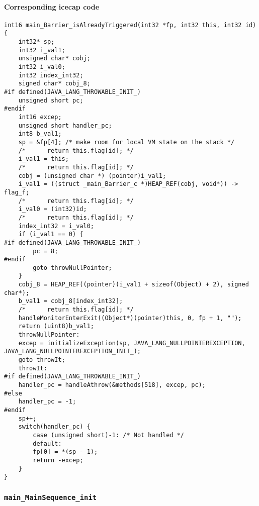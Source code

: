 \paragraph{Corresponding icecap code}\hfill
\begin{lstlisting}[firstnumber=54057]
int16 main_Barrier_isAlreadyTriggered(int32 *fp, int32 this, int32 id)
{
	int32* sp;
	int32 i_val1;
	unsigned char* cobj;
	int32 i_val0;
	int32 index_int32;
	signed char* cobj_8;
#if defined(JAVA_LANG_THROWABLE_INIT_)
	unsigned short pc;
#endif
	int16 excep;
	unsigned short handler_pc;
	int8 b_val1;
	sp = &fp[4]; /* make room for local VM state on the stack */
	/*		return this.flag[id]; */
	i_val1 = this;
	/*		return this.flag[id]; */
	cobj = (unsigned char *) (pointer)i_val1;
	i_val1 = ((struct _main_Barrier_c *)HEAP_REF(cobj, void*)) -> flag_f;
	/*		return this.flag[id]; */
	i_val0 = (int32)id;
	/*		return this.flag[id]; */
	index_int32 = i_val0;
	if (i_val1 == 0) {
#if defined(JAVA_LANG_THROWABLE_INIT_)
		pc = 8;
#endif
		goto throwNullPointer;
	}
	cobj_8 = HEAP_REF((pointer)(i_val1 + sizeof(Object) + 2), signed char*);
	b_val1 = cobj_8[index_int32];
	/*		return this.flag[id]; */
	handleMonitorEnterExit((Object*)(pointer)this, 0, fp + 1, "");
	return (uint8)b_val1;
	throwNullPointer:
	excep = initializeException(sp, JAVA_LANG_NULLPOINTEREXCEPTION, JAVA_LANG_NULLPOINTEREXCEPTION_INIT_);
	goto throwIt;
	throwIt:
#if defined(JAVA_LANG_THROWABLE_INIT_)
	handler_pc = handleAthrow(&methods[518], excep, pc);
#else
	handler_pc = -1;
#endif
	sp++;
	switch(handler_pc) {
		case (unsigned short)-1: /* Not handled */
		default:
		fp[0] = *(sp - 1);
		return -excep;
	}
}
\end{lstlisting}


\subsubsection{\texttt{main\_MainSequence\_init}}

